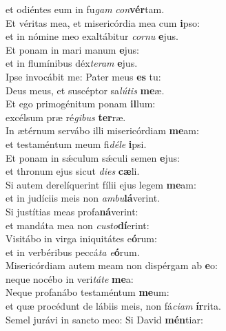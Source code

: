 \oddverse et odiéntes eum in fu\textit{gam} \textit{con}\textbf{vér}tam.\\
\evenverse Et véritas mea, et misericórdia mea cum \textbf{i}pso:~\*\\
\evenverse et in nómine meo exaltábitur \textit{cor}\textit{nu} \textbf{e}jus.\\
\oddverse Et ponam in mari manum \textbf{e}jus:~\*\\
\oddverse et in flumínibus déx\textit{te}\textit{ram} \textbf{e}jus.\\
\evenverse Ipse invocábit me: Pater meus \textbf{es} tu:~\*\\
\evenverse Deus meus, et suscéptor sa\textit{lú}\textit{tis} \textbf{me}æ.\\
\oddverse Et ego primogénitum ponam \textbf{il}lum:~\*\\
\oddverse excélsum præ ré\textit{gi}\textit{bus} \textbf{ter}ræ.\\
\evenverse In ætérnum servábo illi misericórdiam \textbf{me}am:~\*\\
\evenverse et testaméntum meum fi\textit{dé}\textit{le} \textbf{i}psi.\\
\oddverse Et ponam in sǽculum sǽculi semen \textbf{e}jus:~\*\\
\oddverse et thronum ejus sicut \textit{di}\textit{es} \textbf{cæ}li.\\
\evenverse Si autem derelíquerint fílii ejus legem \textbf{me}am:~\*\\
\evenverse et in judíciis meis non \textit{am}\textit{bu}\textbf{lá}verint.\\
\oddverse Si justítias meas profa\textbf{ná}verint:~\*\\
\oddverse et mandáta mea non \textit{cu}\textit{sto}\textbf{dí}erint:\\
\evenverse Visitábo in virga iniquitátes e\textbf{ó}rum:~\*\\
\evenverse et in verbéribus peccá\textit{ta} \textit{e}\textbf{ó}rum.\\
\oddverse Misericórdiam autem meam non dispérgam ab \textbf{e}o:~\*\\
\oddverse neque nocébo in veri\textit{tá}\textit{te} \textbf{me}a:\\
\evenverse Neque profanábo testaméntum \textbf{me}um:~\*\\
\evenverse et quæ procédunt de lábiis meis, non fá\textit{ci}\textit{am} \textbf{ír}rita.\\
\oddverse Semel jurávi in sancto meo: Si David \textbf{mén}tiar:~\*\\
